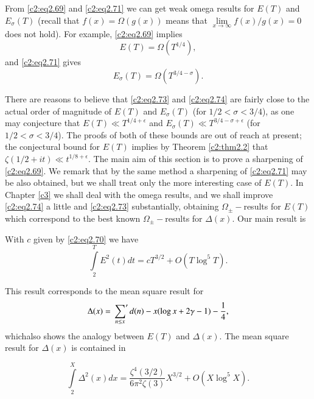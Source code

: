From \eqref{c2:eq2.69} and \eqref{c2:eq2.71} we can get weak omega
results for $E(T)$ and $E_\sigma(T)$ (recall that $f(x) = \Omega
(g(x))$ means that $\displaystyle{\lim\limits_{x \to \infty} f(x)
  /g(x)=0}$ does not hold). For example, \eqref{c2:eq2.69} implies
\begin{equation}
  E(T) = \Omega (T^{1/4}),\label{c2:eq2.73}
\end{equation}
and \eqref{c2:eq2.71} gives
\begin{equation}
  E_\sigma (T) = \Omega (T^{3/4-\sigma}).\label{c2:eq2.74}
\end{equation}

There are reasons to believe that \eqref{c2:eq2.73} and
\eqref{c2:eq2.74} are fairly close to the actual order of magnitude of
$E(T)$ and $E_\sigma(T)$ (for $1/2 < \sigma < 3/4$), as one may
conjecture that $E(T) \ll T^{1/4+\epsilon}$ and $E_\sigma (T) \ll
T^{3/4- \sigma + \epsilon}$ (for $1/2 < \sigma < 3/4$). The proofs of
both of these bounds are out of reach at present; the conjectural
bound for $E(T)$ implies by Theorem \ref{c2:thm2.2} that $\zeta (1/2 +
it)\ll t^{1/8+
 \epsilon}$. The main aim of this section is to prove a sharpening of
\eqref{c2:eq2.69}. We remark that by the same method a sharpening of
\eqref{c2:eq2.71} may be also obtained, but we shall treat only the
more interesting case of $E(T)$. In Chapter \ref{c3} we shall deal with the
omega results, and we shall improve \eqref{c2:eq2.74} a little and
\eqref{c2:eq2.73} substantially, obtaining $\Omega_{\pm}-$results for
$E(T)$ which correspond to the best known $\Omega_{\pm}-$results for
$\Delta  (x)$. Our main result is 

\begin{thm}\label{c2:thm2.4}
  With $c$ given by \eqref{c2:eq2.70} we have
  \begin{equation}
    \int\limits_2^T E^2 (t) dt = c T^{3/2} + O(T \log^5
    T).\label{c2:eq2.75}  
  \end{equation}
\end{thm}

This result corresponds to the mean square result for 
$$
\Delta  (x) = \sideset{}{'}\sum_{n \leq x} d(n) - x(\log x + 2
\gamma -1) - \frac{1}{4},
$$
which\pageoriginale also shows the analogy between $E(T)$ and
$\Delta  (x)$. The mean square result for $\Delta  (x)$ is
contained in 

\begin{thm}\label{c2:thm2.5}
  \begin{equation}
    \int\limits_2^X \Delta ^2 (x) dx = \frac{\zeta^4(3/2)}{6 \pi^2
      \zeta(3)} X^{3/2} + O(X \log^5 X).\label{c2:eq2.76}
  \end{equation}
\end{thm}


